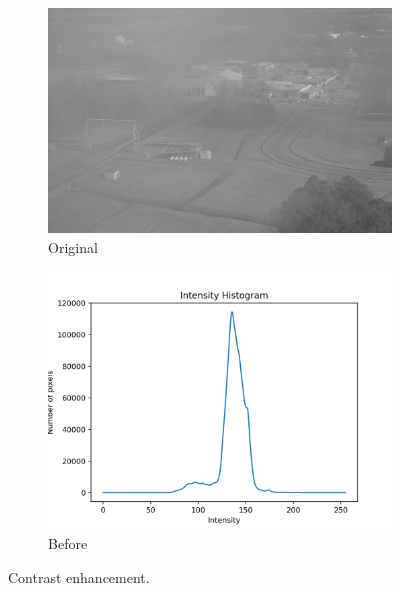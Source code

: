 \documentclass[11pt,a4paper]{article}
\begin{document}
\clearpage

\begin{figure}[ht]
	\ContinuedFloat*
	\centering
	\begin{subfigure}[h]{0.7\textwidth}
		\includegraphics[width=\textwidth]{figs/lc2_gray}
		\caption{Original}
		\label{fig:lc2_orig}
	\end{subfigure}
	\par\bigskip
	\begin{subfigure}[h]{0.75\textwidth}
		\includegraphics[width=\textwidth]{figs/lc2_hist_bef}
		\caption{Before}
		\label{fig:hist_bef_2}
	\end{subfigure}
	
	\caption{Contrast enhancement.}
	\label{fig:eq2}
\end{figure}
\end{document}
